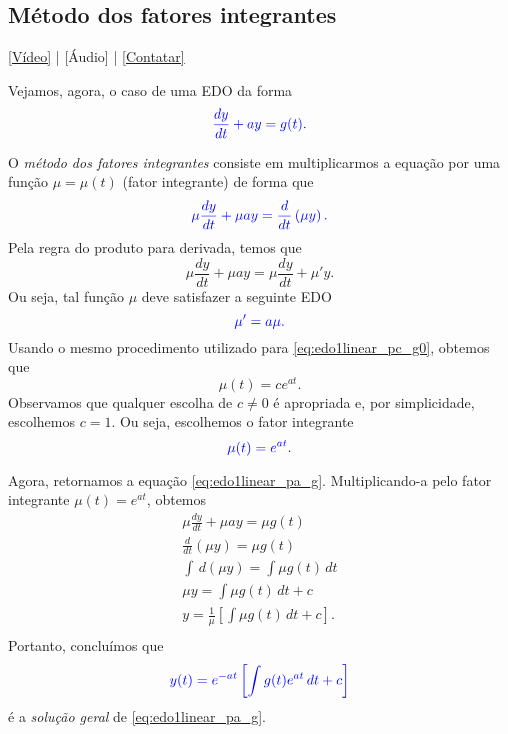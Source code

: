 \subsection{Método dos fatores integrantes}

\begin{flushright}
  \href{https://archive.org/details/edo-ordem-1-linear-coeficientes-constantes-nao-homogenea}{[Vídeo]} | [Áudio] | \href{https://phkonzen.github.io/notas/contato.html}{[Contatar]}
\end{flushright}

Vejamos, agora, o caso de uma EDO da forma
\begin{equation}\label{eq:edo1linear_pa_g}
  \color{blue}{\frac{dy}{dt} + ay = g(t).}
\end{equation}

O \emph{método dos fatores integrantes} consiste em multiplicarmos a equação por uma função $\mu = \mu(t)$ (fator integrante) de forma que
\begin{equation}
  \color{blue}{\mu\frac{dy}{dt} + \mu ay = \frac{d}{dt}\left(\mu y\right).}
\end{equation}
Pela regra do produto para derivada, temos que
\begin{equation}
  \mu\frac{dy}{dt} + \mu ay = \mu\frac{dy}{dt} + \mu'y.
\end{equation}
Ou seja, tal função $\mu$ deve satisfazer a seguinte EDO
\begin{equation}
  \color{blue}{\mu' = a\mu.}
\end{equation}
Usando o mesmo procedimento utilizado para \eqref{eq:edo1linear_pc_g0}, obtemos que
\begin{equation}
  \mu(t) = ce^{at}.
\end{equation}
Observamos que qualquer escolha de $c\neq 0$ é apropriada e, por simplicidade, escolhemos $c=1$. Ou seja, escolhemos o fator integrante
\begin{equation}
  \color{blue}{\mu(t) = e^{at}}.
\end{equation}

Agora, retornamos a equação \eqref{eq:edo1linear_pa_g}. Multiplicando-a pelo fator integrante $\mu(t) = e^{at}$, obtemos
\begin{gather}
  \mu\frac{dy}{dt} + \mu a y = \mu g(t) \\
  \frac{d}{dt}\left(\mu y\right) = \mu g(t) \\
  \int \,d(\mu y) = \int \mu g(t)\,dt \\
  \mu y = \int \mu g(t)\,dt + c \\
  y = \frac{1}{\mu}\left[\int \mu g(t)\,dt + c\right]. \\
\end{gather}
Portanto, concluímos que
\begin{equation}
  \color{blue}{y(t) = e^{-at}\left[\int g(t)e^{at}\,dt + c\right]}
\end{equation}
é a \emph{solução geral} de \eqref{eq:edo1linear_pa_g}.

